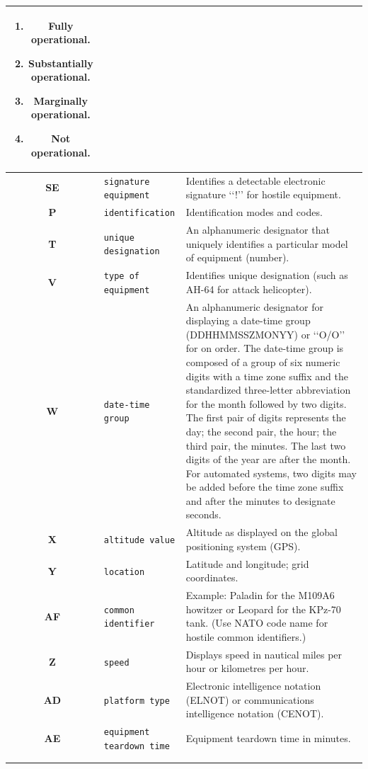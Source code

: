 \documentclass[a4paper, titlepage]{article}
\begin{document}
\begin{center}
\begin{tabularx}{\textwidth}{|c|l|X|}
\begin{enumerate}[label=\arabic*., align=left]
\item Fully operational.
\item Substantially operational.
\item Marginally operational.
\item Not operational.
\end{enumerate} \\ \hline
\textbf{SE} & \texttt{signature equipment} & Identifies a detectable electronic signature \lq\lq{}!\rq\rq{} for hostile equipment. \\ \hline
\textbf{P} & \texttt{identification} & Identification modes and codes.\\ \hline
\textbf{T} & \texttt{unique designation} & An alphanumeric designator that uniquely identifies a particular model of equipment (number).\\ \hline
\textbf{V} & \texttt{type of equipment} & Identifies unique designation (such as AH-64 for attack helicopter).\\ \hline
\textbf{W} & \texttt{date-time group} & An alphanumeric designator for displaying a date-time group (DDHHMMSSZMONYY) or \lq\lq{}O/O\rq\rq{} for on order. The date-time group is composed of a group of six numeric digits with a time zone suffix and the standardized three-letter abbreviation for the month followed by two digits. The first pair of digits represents the day; the second pair, the hour; the third pair, the minutes. The last two digits of the year are after the month. For automated systems, two digits may be added before the time zone suffix and after the minutes to designate seconds.\\ \hline
\textbf{X} & \texttt{altitude value} & Altitude as displayed on the global positioning system (GPS). \\ \hline
\textbf{Y} & \texttt{location} & Latitude and longitude; grid coordinates. \\ \hline
\textbf{AF} & \texttt{common identifier} & Example: Paladin for the M109A6 howitzer or Leopard for the KPz-70 tank. (Use NATO code name for hostile common identifiers.) \\ \hline
\textbf{Z} & \texttt{speed} & Displays speed in nautical miles per hour or kilometres per hour. \\ \hline
\textbf{AD} & \texttt{platform type} & Electronic intelligence notation (ELNOT) or communications intelligence notation (CENOT).\\ \hline
\textbf{AE} & \texttt{equipment teardown time} & Equipment teardown time in minutes.\\ \hline
\multicolumn{3}{c}{}\\
\caption{Description of \textbf{\texttt{MilLand}} text field amplifiers.}
\label{equiptexttable}
\end{tabularx}
\end{center}
\end{document}
